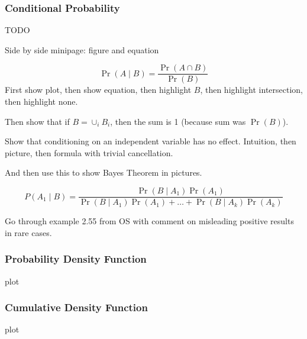 \documentclass[t]{beamer}
\begin{document}
\begin{frame}
  \frametitle{Conditional Probability}

  TODO

  Side by side minipage: figure and equation

  \begin{displaymath}
    \Pr(A\mid B) = \frac{\Pr(A\cap B)}{\Pr(B)}
  \end{displaymath}
  First show plot, then show equation, then highlight $B$, then
  highlight intersection, then highlight none.

  Then show that if $B=\cup_i B_i$, then the sum is 1 (because sum was
  $\Pr(B)$).

  Show that conditioning on an independent variable has no effect.
  Intuition, then picture, then formula with trivial cancellation.

  And then use this to show Bayes Theorem in pictures.

  \begin{displaymath}
    P(A_1 \mid B) = \frac{\Pr(B\mid A_1) \Pr(A_1)}{\Pr(B\mid A_1)\Pr(A_1) + \dots +
      \Pr(B\mid A_k)\Pr(A_k)}
  \end{displaymath}

  Go through example 2.55 from OS with comment on misleading positive
  results in rare cases.
\end{frame}

\begin{frame}
  \frametitle{Probability Density Function}

  plot

\end{frame}

\begin{frame}
  \frametitle{Cumulative Density Function}

  plot

\end{frame}
\end{document}
